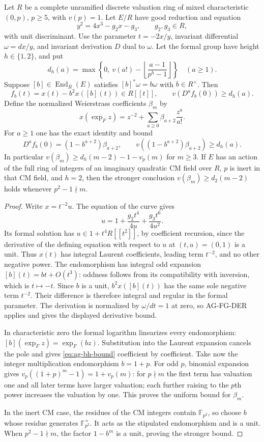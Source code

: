 \begin{proposition}
Let $R$ be a complete unramified discrete valuation ring of mixed
characteristic $(0,p)$, $p\ge5$, with $v(p)=1$. Let $E/R$ have good
reduction and equation
\[
 y^2=4x^3-g_2x-g_3,\qquad g_2,g_3\in R,
\]
with unit discriminant. Use the parameter $t=-2x/y$, invariant
differential $\omega=dx/y$, and invariant derivation $D$ dual to
$\omega$. Let the formal group have height $h\in\{1,2\}$, and put
\[
 d_h(a)=\max\left\{0,\ v(a!)-
                   \left\lfloor\frac{a-1}{p^h-1}\right\rfloor\right\}
 \quad(a\ge1).
\]
Suppose $[b]\in\operatorname{End}_R(E)$ satisfies
$[b]^*\omega=b\omega$ with $b\in R^\times$. Then
\[
 f_b(t)=x(t)-b^2x([b](t))\in R[[t]],\qquad
 v(D^a f_b(0))\ge d_h(a).
\]
Define the normalized Weierstrass coefficients $\beta_m$ by
\[
 x(\exp_F z)=z^{-2}+\sum_{a\ge0}\beta_{a+2}\frac{z^a}{a!}.
\]
For $a\ge1$ one has the exact identity and bound
\begin{equation}\label{eq:ag-bh-bound}
 D^a f_b(0)=(1-b^{a+2})\beta_{a+2},\qquad
 v((1-b^{a+2})\beta_{a+2})\ge d_h(a).
\end{equation}
In particular
$v(\beta_m)\ge d_h(m-2)-1-v_p(m)$ for $m\ge3$.
If $E$ has an action of the full ring of integers of an imaginary
quadratic CM field over $R$, $p$ is
inert in that CM field, and $h=2$, then the stronger conclusion
$v(\beta_m)\ge d_2(m-2)$ holds whenever $p^2-1\nmid m$.
\end{proposition}
\begin{proof}
Write $x=t^{-2}u$. The equation of the curve gives
\[
 u=1+\frac{g_2t^4}{4u}+\frac{g_3t^6}{4u^2}.
\]
Its formal solution has $u\in1+t^4R[[t^2]]$, by coefficient
recursion, since the derivative of the defining equation with
respect to $u$ at $(t,u)=(0,1)$ is a unit. Thus $x(t)$ has integral
Laurent coefficients, leading term $t^{-2}$, and no other negative
power. The endomorphism has integral odd expansion
$[b](t)=bt+O(t^3)$: oddness follows from its compatibility with
inversion, which is $t\mapsto-t$. Since $b$ is a unit,
$b^2x([b](t))$ has the same sole negative term $t^{-2}$.
Their difference is therefore integral and regular in the formal
parameter. The derivation is normalized by $\omega/dt=1$ at zero,
so AG-FG-DER applies and gives the displayed derivative bound.

In characteristic zero the formal logarithm linearizes every
endomorphism: $[b](\exp_F z)=\exp_F(bz)$. Substitution into the
Laurent expansion cancels the pole and gives
\eqref{eq:ag-bh-bound} coefficient by coefficient.
Take now the integer multiplication endomorphism $b=1+p$.
For odd $p$, binomial expansion gives
$v_p((1+p)^m-1)=1+v_p(m)$: for $p\nmid m$ the first term
has valuation one and all later terms have larger valuation;
each further raising to the $p$th power increases the valuation
by one. This proves the uniform bound for $\beta_m$.

In the inert CM case, the residues of the CM integers contain
$\mathbb F_{p^2}$, so choose $b$ whose residue generates
$\mathbb F_{p^2}^{\times}$. It acts as the stipulated
endomorphism and is a unit. When $p^2-1\nmid m$, the factor
$1-b^m$ is a unit, proving the stronger bound.
\end{proof}

